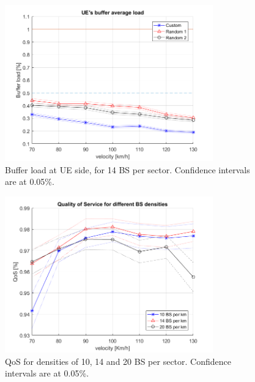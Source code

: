 \documentclass[conference,10pt]{IEEEtran}
\begin{document}
\begin{figure}[b]
	\label{fig:7BS_buffer_load}
	\centering
	\includegraphics[width=9cm]{UE_buffer.png}
	\caption{Buffer load at UE side, for 14 BS per sector. Confidence intervals are at 0.05\%.}
\end{figure}

\begin{figure}[b]
	\label{fig:QoS_all}
	\centering
	\includegraphics[width=9cm]{QoS_10-14-20-BS_densities.png}
	\caption{QoS for densities of 10, 14 and 20 BS per sector. Confidence intervals are at 0.05\%.}
\end{figure}
\end{document}
